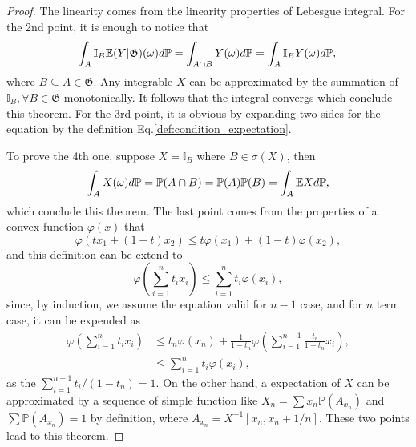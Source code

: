 \begin{proof}
The linearity comes from the linearity properties of Lebesgue integral. For the 2nd point, it is enough to notice that
\begin{equation*}
\int_A\mathbb{I}_{B}\mathbb{E}(Y|\mathfrak{G})(\omega)d\mathbb{P}=\int_{A\cap B}Y(\omega)d\mathbb{P}=\int_A\mathbb{I}_BY(\omega)d\mathbb{P},\\
\end{equation*}
where $B\subseteq A\in\mathfrak{G}$. Any integrable $X$ can be approximated by the summation of $\mathbb{I}_B,\forall B\in \mathfrak{G}$ monotonically. It follows that the integral convergs which conclude this theorem.
For the 3rd point, it is obvious by expanding two sides for the equation by the definition Eq.\ref{def:condition_expectation}. 

To prove the 4th one, suppose $X=\mathbb{I}_B$ where $B\in\sigma(X)$, then
\begin{equation*}
\int_A X(\omega)d\mathbb{P}=\mathbb{P}(A\cap B)=\mathbb{P}(A)\mathbb{P}(B)=\int_A \mathbb{E} Xd\mathbb{P},
\end{equation*}
which conclude this theorem.
The last point comes from the properties of a convex function $\varphi(x)$ that
\begin{equation}
\varphi(tx_1+(1-t)x_2)\le t\varphi(x_1)+(1-t)\varphi(x_2),
\end{equation}
and this definition can be extend to 
\begin{equation}
\varphi\left(\sum_{i=1}^nt_ix_i\right)\le\sum_{i=1}^nt_i\varphi(x_i),
\end{equation}
since, by induction, we assume the equation valid for $n-1$ case, and for $n$ term case, it can be expended as
\begin{equation*}
\begin{aligned}
\varphi\left(\sum_{i=1}^nt_ix_i\right)&\le t_n\varphi(x_n)+\frac{1}{1-t_n}\varphi\left(\sum_{i=1}^{n-1}\frac{t_i}{1-t_n}x_i\right),\\
&\le\sum_{i=1}^nt_i\varphi(x_i),
\end{aligned}
\end{equation*}
as the $\sum_{i=1}^{n-1}t_i/(1-t_n)=1$. On the other hand, a expectation of $X$ can be approximated by a sequence of simple function like $X_n=\sum x_n\mathbb{P}(A_{x_n})$ and $\sum\mathbb{P}(A_{x_n})=1$ by definition, where $A_{x_n}=X^{-1}[x_n,x_n+1/n]$. These two points lead to this theorem.
\end{proof}
